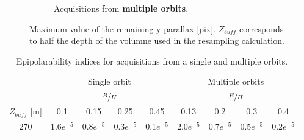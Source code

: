 \documentclass{ipol}
\begin{document}
\begin{figure}
\begin{center}
\begin{subfigure}[b]{\textwidth}
\begin{minipage}[t]{\textwidth}
\begin{tabular}{|c|c|c|c|c||c|c|c|c|}
\end{tabular}\caption{Acquisitions from \textbf{multiple orbits}.}
		\end{minipage}
		\end{subfigure}
		\caption{Maximum value of the remaining y-parallax [pix]. $Z_{buff}$ corresponds to half the depth of the volumne used in the resampling calculation.}
		\label{tabs:pleiSingleMulti}
	\end{center}
\end{figure}
\begin{table}%

\begin{center}
\begin{tabular}{|c|c|c|c|c||c|c|c|c|}

\multicolumn{1}{c}{}  & \multicolumn{4}{c}{Single orbit} & \multicolumn{4}{c}{Multiple orbits}   \\
 \cline{2-9} 
 \multicolumn{1}{c}{}  & \multicolumn{4}{|c||}{ $\sfrac{B}{H}$ } & \multicolumn{4}{|c|}{$\sfrac{B}{H}$ }  \\
 \multicolumn{1}{c|}{$Z_{buff}$ [m]}  &  0.1 &  0.15   & 0.25  &  0.45 &  0.13 &  0.2   & 0.3  &  0.4   \\
 \cline{1-9}
  
270  &   1.6$e^{-5}$    &  0.8$e^{-5}$  &  0.3$e^{-5}$  &  0.1$e^{-5}$   &   2.0$e^{-5}$  &     0.7$e^{-5}$  &  0.5$e^{-5}$   &    0.2$e^{-5}$ \\
\hline 

\end{tabular}
\end{center}
\caption{Epipolarability indices for acquisitions from a single and {multiple orbits}.}\label{tab:PHR1indices}
\end{table}
\end{document}
